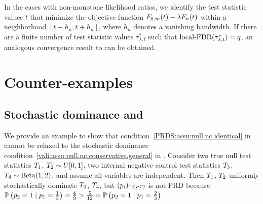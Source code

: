 

\begin{remark}\label{rmk:non.monotone}
    In the cases with non-monotone likelihood ratios, we identify the test
    statistic values $t$ that minimize the objective function
    ${{F}_{0,m}}({t}) - \lambda
{{F}_n}({t})$ within a neighborhood $[t -h_n, t+h_n]$, where $h_n$ denotes a vanishing bandwidth. If there are a finite number of test statistic values $\tau_{\lambda,l}^*$ such that $\text{local-FDR}(\tau_{\lambda,l}^*) = q$, an analogous convergence result to  can be obtained.
\end{remark}


\section{Counter-examples}\label{sec:example}

\subsection{Stochastic dominance and \PRDS}\label{sec:example.PRDS}

We provide an example to show that condition~\ref{PRDS:assu:null.nc.identical} in
 cannot be relaxed to the
stochastic dominance
condition~\ref{vali:assu:null.nc.conservative.general} in
.
Consider two true null test statistics ${T_{1}}$, ${T_{2}} \sim U[0,1]$, two internal negative control test statistics ${T_{3}}$, ${T_{4}} \sim \text{Beta}(1,2)$, and assume all variables are independent.
Then ${T_{1}}$, ${T_{2}}$ uniformly stochastically dominate ${T_{3}}$, ${T_{4}}$, but
$({p_{i}})_{1 \le i \le 2}$ is not PRD because
$\mathbb{P}\left({p_{2}} = 1 \mid {p_{1}} = \frac{1}{3}\right)
= \frac{4}{9}
> \frac{5}{12}
= \mathbb{P}\left({p_{2}} = 1 \mid {p_{1}} = \frac{2}{3}\right)$.



